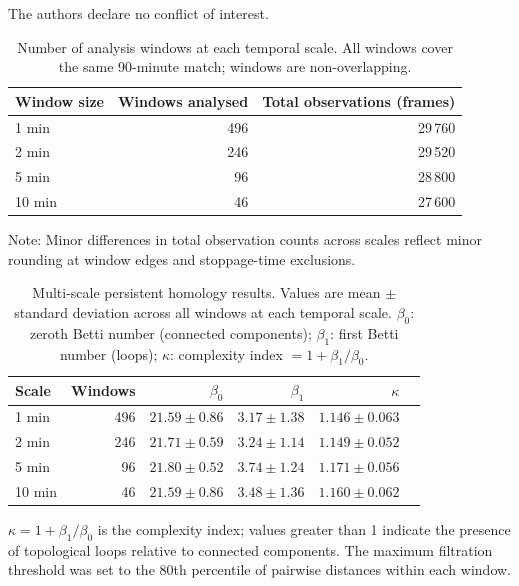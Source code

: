 \documentclass[11pt,a4paper]{article}
\begin{document}
The authors declare no conflict of interest.


\clearpage

\begin{table}[H]
\centering
\caption{Number of analysis windows at each temporal scale.
  All windows cover the same 90-minute match; windows are
  non-overlapping.}
\label{tab:windows}
\begin{threeparttable}
\begin{tabular}{@{}lrr@{}}
\toprule
Window size & Windows analysed & Total observations (frames) \\
\midrule
1 min  & 496 & 29\,760 \\
2 min  & 246 & 29\,520 \\
5 min  &  96 & 28\,800 \\
10 min &  46 & 27\,600 \\
\bottomrule
\end{tabular}
\begin{tablenotes}
\small
\item Note: Minor differences in total observation counts
  across scales reflect minor rounding at window edges and
  stoppage-time exclusions.
\end{tablenotes}
\end{threeparttable}
\end{table}

\begin{table}[H]
\centering
\caption{Multi-scale persistent homology results.
  Values are mean \(\pm\) standard deviation across all
  windows at each temporal scale.  \(\beta_0\): zeroth
  Betti number (connected components); \(\beta_1\):
  first Betti number (loops); \(\kappa\): complexity
  index \(= 1 + \beta_1/\beta_0\).}
\label{tab:multiscale}
\begin{threeparttable}
\begin{tabular}{@{}lrrrrr@{}}
\toprule
Scale  & Windows & \(\beta_0\) & \(\beta_1\) & \(\kappa\) \\
\midrule
1 min  & 496 & \(21.59 \pm 0.86\) & \(3.17 \pm 1.38\) & \(1.146 \pm 0.063\) \\
2 min  & 246 & \(21.71 \pm 0.59\) & \(3.24 \pm 1.14\) & \(1.149 \pm 0.052\) \\
5 min  &  96 & \(21.80 \pm 0.52\) & \(3.74 \pm 1.24\) & \(1.171 \pm 0.056\) \\
10 min &  46 & \(21.59 \pm 0.86\) & \(3.48 \pm 1.36\) & \(1.160 \pm 0.062\) \\
\bottomrule
\end{tabular}
\begin{tablenotes}
\small
\item \(\kappa = 1 + \beta_1/\beta_0\) is the complexity
  index; values greater than 1 indicate the presence of
  topological loops relative to connected components.
  The maximum filtration threshold was set to the 80th
  percentile of pairwise distances within each window.
\end{tablenotes}
\end{threeparttable}
\end{table}
\end{document}
